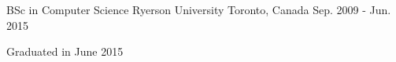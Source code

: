 \begin{cventries}
  \cventry
    {BSc in Computer Science}
    {Ryerson University}
    {Toronto, Canada}
    {Sep. 2009 - Jun. 2015}
    {
      \begin{cvitems}
        \item {Graduated in June 2015}
      \end{cvitems}
    }
\end{cventries}
